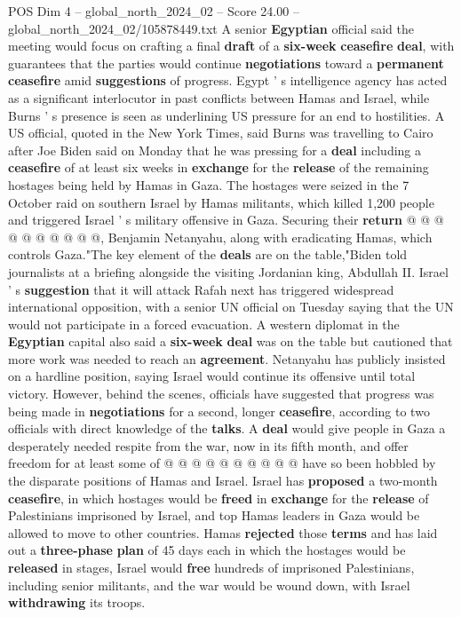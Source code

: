 \begin{textsample}{POS Dim 4 – global\_north\_2024\_02 – Score 24.00 – global\_north\_2024\_02/105878449.txt}
A senior \textbf{Egyptian} official said the meeting would focus on crafting a final \textbf{draft} of a \textbf{six-week} \textbf{ceasefire} \textbf{deal}, with guarantees that the parties would continue \textbf{negotiations} toward a \textbf{permanent} \textbf{ceasefire} amid \textbf{suggestions} of progress.
Egypt ' s intelligence agency has acted as a significant interlocutor in past conflicts between Hamas and Israel, while Burns ' s presence is seen as underlining US pressure for an end to hostilities.
A US official, quoted in the New York Times, said Burns was travelling to Cairo after Joe Biden said on Monday that he was pressing for a \textbf{deal} including a \textbf{ceasefire} of at least six weeks in \textbf{exchange} for the \textbf{release} of the remaining hostages being held by Hamas in Gaza.
The hostages were seized in the 7 October raid on southern Israel by Hamas militants, which killed 1,200 people and triggered Israel ' s military offensive in Gaza.
Securing their \textbf{return} @ @ @ @ @ @ @ @ @ @, Benjamin Netanyahu, along with eradicating Hamas, which controls Gaza."The key element of the \textbf{deals} are on the table,"Biden told journalists at a briefing alongside the visiting Jordanian king, Abdullah II.
Israel ' s \textbf{suggestion} that it will attack Rafah next has triggered widespread international opposition, with a senior UN official on Tuesday saying that the UN would not participate in a forced evacuation.
A western diplomat in the \textbf{Egyptian} capital also said a \textbf{six-week} \textbf{deal} was on the table but cautioned that more work was needed to reach an \textbf{agreement}.
Netanyahu has publicly insisted on a hardline position, saying Israel would continue its offensive until total victory.
However, behind the scenes, officials have suggested that progress was being made in \textbf{negotiations} for a second, longer \textbf{ceasefire}, according to two officials with direct knowledge of the \textbf{talks}.
A \textbf{deal} would give people in Gaza a desperately needed respite from the war, now in its fifth month, and offer freedom for at least some of @ @ @ @ @ @ @ @ @ @ have so been hobbled by the disparate positions of Hamas and Israel.
Israel has \textbf{proposed} a two-month \textbf{ceasefire}, in which hostages would be \textbf{freed} in \textbf{exchange} for the \textbf{release} of Palestinians imprisoned by Israel, and top Hamas leaders in Gaza would be allowed to move to other countries.
Hamas \textbf{rejected} those \textbf{terms} and has laid out a \textbf{three-phase} \textbf{plan} of 45 days each in which the hostages would be \textbf{released} in stages, Israel would \textbf{free} hundreds of imprisoned Palestinians, including senior militants, and the war would be wound down, with Israel \textbf{withdrawing} its troops.

\end{textsample}
